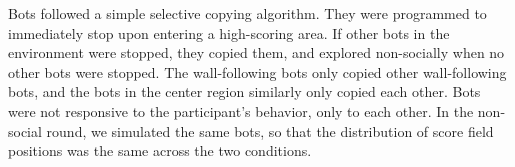 \documentclass[12pt,letterpaper]{article}
\begin{document}
Bots followed a simple selective copying algorithm. 
They were programmed to immediately stop upon entering a high-scoring area.
If other bots in the environment were stopped, they copied them, and explored non-socially when no other bots were stopped.
The wall-following bots only copied other wall-following bots, and the bots in the center region similarly only copied each other.
Bots were not responsive to the participant's behavior, only to each other.
In the non-social round, we simulated the same bots, so that the distribution of score field positions was the same across the two conditions. 





\end{document}
